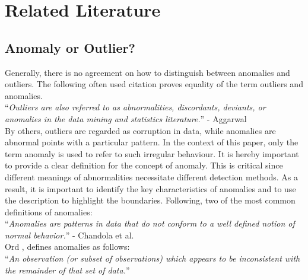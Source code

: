 
\chapter{Related Literature} %

\label{2.} %


\section{Anomaly or Outlier?}

Generally, there is no agreement on how to distinguish between anomalies and outliers. The following often used citation proves equality of the term outliers and anomalies.\\

\noindent\enquote{\itshape Outliers are also referred to as abnormalities, discordants, deviants, or anomalies in the data mining
	and statistics literature.} - Aggarwal \parencite*{Aggarwal2013}\\

By others, outliers are regarded as corruption in data, while anomalies are abnormal points with a particular pattern. 
In the context of this paper, only the term anomaly is used to refer to such irregular behaviour. It is hereby important to provide a clear definition for the concept of anomaly. This is critical since different meanings of abnormalities necessitate different detection methods. As a result, it is important to identify the key characteristics of anomalies and to use the description to highlight the boundaries. Following, two of the most common definitions of anomalies:\\

\noindent\enquote{\itshape Anomalies are patterns in data that do not conform to a well defined notion of normal behavior.} - Chandola et al. \parencite*{Chandola2009}\\

Ord \parencite*{Ord1996}, defines anomalies as follows:\\

\noindent\enquote{\itshape An observation (or subset of observations) which appears to be inconsistent with the remainder of that set of data.}\\

